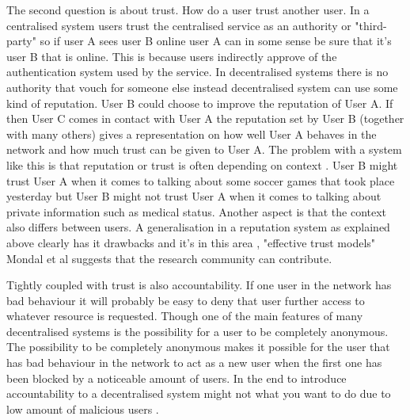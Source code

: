 The second question is about trust.
How do a user trust another user.
In a centralised system users trust the centralised service as an authority or "third-party" so if user A sees user B online user A can in some sense be sure that it's user B that is online.
This is because users indirectly approve of the authentication system used by the service.
In decentralised systems there is no authority that vouch for someone else instead decentralised system can use some kind of reputation.
User B could choose to improve the reputation of User A.
If then User C comes in contact with User A the reputation set by User B (together with many others) gives a representation on how well User A behaves in the network and how much trust can be given to User A.
The problem with a system like this is that reputation or trust is often depending on context \cite{mondal2006}.
User B might trust User A when it comes to talking about some soccer games that took place yesterday but User B might not trust User A when it comes to talking about private information such as medical status.
Another aspect is that the context also differs between users.
A generalisation in a reputation system as explained above clearly has it drawbacks and it's in this area , "effective trust models" Mondal et al \cite{mondal2006} suggests that the research community can contribute.

Tightly coupled with trust is also accountability.
If one user in the network has bad behaviour it will probably be easy to deny that user further access to whatever resource is requested.
Though one of the main features of many decentralised systems is the possibility for a user to be completely anonymous.
The possibility to be completely anonymous makes it possible for the user that has bad behaviour in the network to act as a new user when the first one has been blocked by a noticeable amount of users.
In the end to introduce accountability to a decentralised system might not what you want to do due to low amount of malicious users \cite{mondal2006}.

